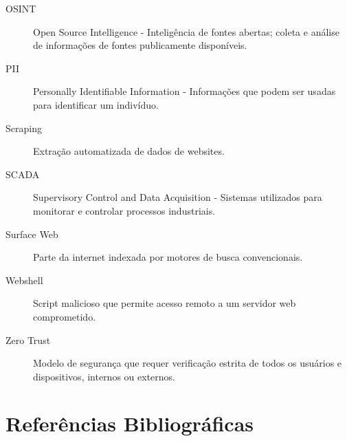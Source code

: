 \documentclass[12pt,a4paper]{book}
\begin{document}
\begin{description}
    \item[OSINT] Open Source Intelligence - Inteligência de fontes abertas; coleta e análise de informações de fontes publicamente disponíveis.
    
    \item[PII] Personally Identifiable Information - Informações que podem ser usadas para identificar um indivíduo.
    
    \item[Scraping] Extração automatizada de dados de websites.
    
    \item[SCADA] Supervisory Control and Data Acquisition - Sistemas utilizados para monitorar e controlar processos industriais.
    
    \item[Surface Web] Parte da internet indexada por motores de busca convencionais.
    
    \item[Webshell] Script malicioso que permite acesso remoto a um servidor web comprometido.
    
    \item[Zero Trust] Modelo de segurança que requer verificação estrita de todos os usuários e dispositivos, internos ou externos.
\end{description}

\section{Referências Bibliográficas}
\end{document}
